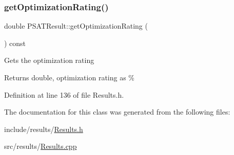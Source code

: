 \mbox{\label{class_p_s_a_t_result_aa0a7001461408fcb06a6c22ce2d064db}} 
\subsubsection{\texorpdfstring{get\+Optimization\+Rating()}{getOptimizationRating()}}
{\footnotesize\ttfamily double P\+S\+A\+T\+Result\+::get\+Optimization\+Rating (\begin{DoxyParamCaption}{ }\end{DoxyParamCaption}) const\hspace{0.3cm}{\ttfamily [inline]}}

Gets the optimization rating \begin{DoxyReturn}{Returns}
double, optimization rating as \% 
\end{DoxyReturn}


Definition at line 136 of file Results.\+h.



The documentation for this class was generated from the following files\+:\begin{DoxyCompactItemize}
\item 
include/results/\hyperlink{_results_8h}{Results.\+h}\item 
src/results/\hyperlink{_results_8cpp}{Results.\+cpp}\end{DoxyCompactItemize}
